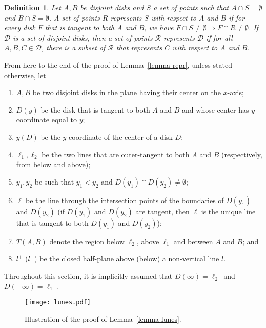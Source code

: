 \documentclass[pdftex,leqno,fleqn,12pt]{article}
\newtheorem{definition}[theorem]{Definition}
\begin{document}
\begin{definition}\label{def-repr} Let $A,B$ be disjoint disks and $S$ a set of points such
that $A\cap S=\emptyset$ and $B\cap S=\emptyset$. A set of points $R$
\emph{represents} $S$ with respect to $A$ and $B$ if for every disk $F$ that is tangent to both $A$ and
$B$, we have $F\cap S\neq\emptyset\Rightarrow F\cap R\neq\emptyset$. If $\mathcal{D}$ is a set of
disjoint disks, then a set of points $\mathcal{R}$ \emph{represents} $\mathcal{D}$ if for all
$A,B,C\in\mathcal{D}$, there is a subset of $\mathcal{R}$ that represents $C$ with respect to $A$
and $B$.
\end{definition}
From here to the end of the proof of Lemma~\ref{lemma-repr}, unless stated otherwise, let
\begin{enumerate}
\item $A,B$ be two disjoint disks in the plane having their
center on the $x$-axis;
\item $D(y)$ be the disk that is tangent to both $A$ and $B$ and whose center has
$y$-coordinate equal to $y$;
\item $y(D)$ be the $y$-coordinate of the center of a disk $D$;
\item $\ell_1,\ell_2$ be the two lines that are outer-tangent to both $A$ and $B$ (respectively, from below and above);
\item $y_1,y_2$ be such that $y_1<y_2$ and $D(y_1)\cap D(y_2)\neq \emptyset$;
\item $\ell$ be the line through the intersection points of the boundaries of $D(y_1)$ and $D(y_2)$
(if $D(y_1)$ and $D(y_2)$ are tangent, then $\ell$ is the unique line that is tangent to both
$D(y_1)$ and $D(y_2)$);
\item $T(A,B)$ denote the region below $\ell_2$, above $\ell_1$ and between
$A$ and $B$; and
\item $l^+$ ($l^-$) be the closed half-plane above (below) a non-vertical line $l$.
\end{enumerate}
Throughout this section, it is implicitly assumed that $D(\infty)=\ell_2^+$ and $D(-\infty)=\ell_1^-$.
\begin{figure}
\centering\texttt{[image: lunes.pdf]}\caption{Illustration of the proof of
Lemma~\ref{lemma-lunes}.}\label{fig-lemma-lunes}
\end{figure}
\end{document}
